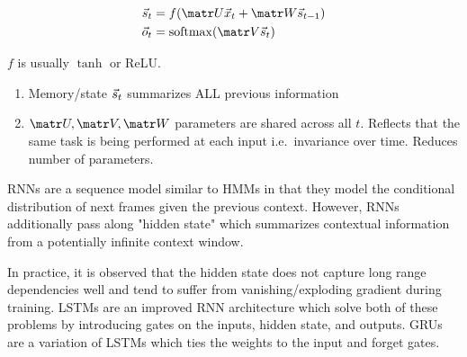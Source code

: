 \documentclass[a4paper,12pt,twoside,openright]{report}
\begin{document}
\begin{align}
    \s_t &= f(\U \x_t + \W \s_{t-1}) \\
    \o_t &= \softmax( \V \s_t)
\end{align}

$f$ is usually $\tanh$ or ReLU.

\begin{enumerate}
    \item Memory/state $\vec{s}_t$ summarizes ALL previous information
    \item $\U, \V, \W$ parameters are shared across all $t$. Reflects
        that the same task is being performed at each input i.e.\
        invariance over time. Reduces number of parameters.
\end{enumerate}


RNNs are a sequence model similar to HMMs in that they model the conditional
distribution of next frames given the previous context. However, RNNs additionally
pass along "hidden state" which summarizes contextual information from a potentially
infinite context window.

In practice, it is observed that the hidden state does not capture long range
dependencies well and tend to suffer from vanishing/exploding gradient during
training. LSTMs are an improved RNN architecture which solve both of these
problems by introducing gates on the inputs, hidden state, and outputs. GRUs are
a variation of LSTMs which ties the weights to the input and forget gates.
\end{document}
